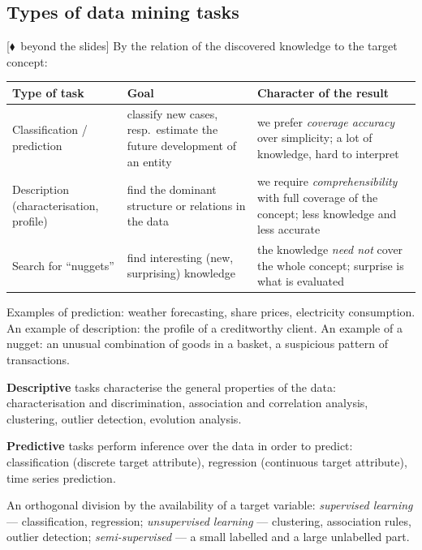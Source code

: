\documentclass[11pt,a4paper]{article}
\theoremstyle{definition}
\providecommand{\uv}[1]{``#1''}
\newcommand{\mimo}{\textcolor{markcol}{\textsf{\footnotesize[$\blacklozenge$~beyond the slides]}}}
\begin{document}
\subsection{Types of data mining tasks}

\mimo{} By the relation of the discovered knowledge to the target concept:

\begin{center}
\small
\begin{tabular}{@{}p{2.9cm}p{6.0cm}p{6.4cm}@{}}
\toprule
\textbf{Type of task} & \textbf{Goal} & \textbf{Character of the result} \\
\midrule
Classification / prediction & classify new cases, resp.\ estimate the future development of an
  entity & we prefer \emph{coverage accuracy} over simplicity; a lot of knowledge, hard to
  interpret \\
Description (characterisation, profile) & find the dominant structure or relations in the data
  & we require \emph{comprehensibility} with full coverage of the concept; less knowledge and
  less accurate \\
Search for \uv{nuggets} & find interesting (new, surprising) knowledge & the knowledge
  \emph{need not} cover the whole concept; surprise is what is evaluated \\
\bottomrule
\end{tabular}
\end{center}

Examples of prediction: weather forecasting, share prices, electricity consumption. An example
of description: the profile of a creditworthy client. An example of a nugget: an unusual
combination of goods in a basket, a suspicious pattern of transactions.

\begin{defbox}
\textbf{Descriptive} tasks characterise the general properties of the data: characterisation
and discrimination, association and correlation analysis, clustering, outlier detection,
evolution analysis.

\textbf{Predictive} tasks perform inference over the data in order to predict: classification
(discrete target attribute), regression (continuous target attribute), time series prediction.

An orthogonal division by the availability of a target variable: \emph{supervised learning} ---
classification, regression; \emph{unsupervised learning} --- clustering, association rules,
outlier detection; \emph{semi-supervised} --- a small labelled and a large unlabelled part.
\end{defbox}
\end{document}
